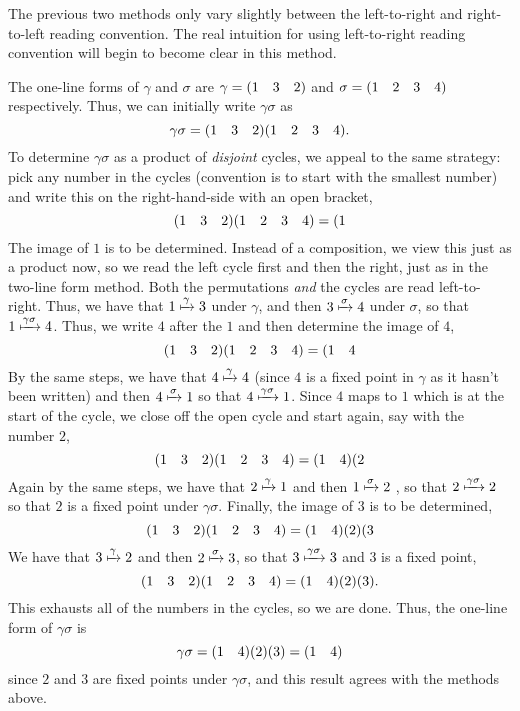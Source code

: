 \begin{example}
     The previous two methods only vary slightly between the left-to-right and right-to-left reading convention. The real intuition for using left-to-right reading convention will begin to become clear in this method.

    The one-line forms of $\gamma$ and $\sigma$ are $\gamma = (1 \quad 3 \quad 2)$ and $\sigma = (1 \quad 2 \quad 3 \quad 4)$ respectively. Thus, we can initially write $\gamma\sigma$ as
    \[
    \gamma\sigma = (1 \quad 3 \quad 2)(1 \quad 2 \quad 3 \quad 4).
    \]
    To determine $\gamma\sigma$ as a product of \textit{disjoint} cycles, we appeal to the same strategy: pick any number in the cycles (convention is to start with the smallest number) and write this on the right-hand-side with an open bracket,
    \[
    (1 \quad 3 \quad 2)(1 \quad 2 \quad 3 \quad 4) = (1
    \]
    The image of $1$ is to be determined. Instead of a composition, we view this just as a product now, so we read the left cycle first and then the right, just as in the two-line form method. Both the permutations \textit{and} the cycles are read left-to-right. Thus, we have that $1 \xmapsto{\gamma} 3$ under $\gamma$, and then $3 \xmapsto{\sigma} 4$ under $\sigma$, so that $1 \xmapsto{\gamma\sigma} 4$. Thus, we write $4$ after the $1$ and then determine the image of $4$,
    \[
    (1 \quad 3 \quad 2)(1 \quad 2 \quad 3 \quad 4) = (1 \quad 4
    \]
    By the same steps, we have that $4 \xmapsto{\gamma} 4$ (since $4$ is a fixed point in $\gamma$ as it hasn't been written) and then $4 \xmapsto{\sigma} 1$ so that $4 \xmapsto{\gamma\sigma} 1$. Since $4$ maps to $1$ which is at the start of the cycle, we close off the open cycle and start again, say with the number $2$,
    \[
    (1 \quad 3 \quad 2)(1 \quad 2 \quad 3 \quad 4) = (1 \quad 4)(2
    \]
    Again by the same steps, we have that $2 \xmapsto{\gamma} 1$ and then $1 \xmapsto{\sigma} 2$ , so that $2 \xmapsto{\gamma\sigma} 2$ so that $2$ is a fixed point under $\gamma\sigma$. Finally, the image of $3$ is to be determined,
    \[
    (1 \quad 3 \quad 2)(1 \quad 2 \quad 3 \quad 4) = (1 \quad 4)(2)(3
    \]
    We have that $3 \xmapsto{\gamma} 2$ and then $2 \xmapsto{\sigma} 3$, so that $3 \xmapsto{\gamma\sigma} 3$ and $3$ is a fixed point,
    \[
    (1 \quad 3 \quad 2)(1 \quad 2 \quad 3 \quad 4) = (1 \quad 4)(2)(3).
    \]
    This exhausts all of the numbers in the cycles, so we are done. Thus, the one-line form of $\gamma\sigma$ is
    \[
    \gamma\sigma = (1 \quad 4)(2)(3) = (1 \quad 4)
    \]
    since $2$ and $3$ are fixed points under $\gamma\sigma$, and this result agrees with the methods above.
\end{example}

